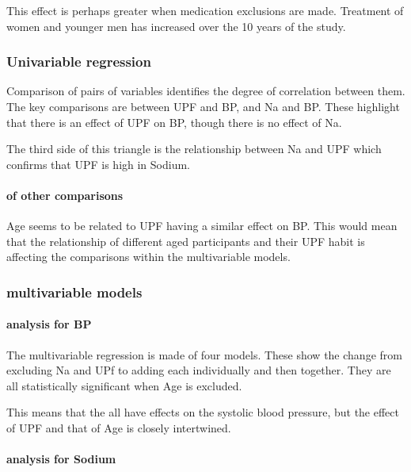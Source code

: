 \documentclass[
]{article}
\begin{document}
This effect is perhaps greater when medication exclusions are made.
Treatment of women and younger men has increased over the 10 years of
the study.

\hypertarget{univariable-regression}{%
\subsubsection{Univariable regression}\label{univariable-regression}}

Comparison of pairs of variables identifies the degree of correlation
between them. The key comparisons are between UPF and BP, and Na and BP.
These highlight that there is an effect of UPF on BP, though there is no
effect of Na.

The third side of this triangle is the relationship between Na and UPF
which confirms that UPF is high in Sodium.

\hypertarget{of-other-comparisons}{%
\paragraph{of other comparisons}\label{of-other-comparisons}}

Age seems to be related to UPF having a similar effect on BP. This would
mean that the relationship of different aged participants and their UPF
habit is affecting the comparisons within the multivariable models.

\hypertarget{multivariable-models}{%
\subsubsection{multivariable models}\label{multivariable-models}}

\hypertarget{analysis-for-bp}{%
\paragraph{analysis for BP}\label{analysis-for-bp}}

The multivariable regression is made of four models. These show the
change from excluding Na and UPf to adding each individually and then
together. They are all statistically significant when Age is excluded.

This means that the all have effects on the systolic blood pressure, but
the effect of UPF and that of Age is closely intertwined.

\hypertarget{analysis-for-sodium}{%
\paragraph{analysis for Sodium}\label{analysis-for-sodium}}
\end{document}

